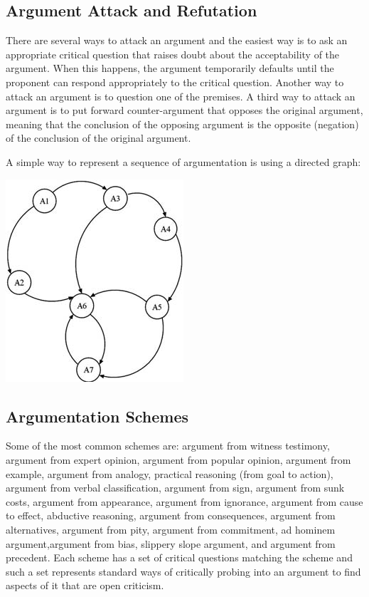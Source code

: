 \subsection{Argument Attack and Refutation}
\par
There are several ways to attack an argument and the easiest way is to ask an appropriate critical question that raises doubt about the acceptability of the argument. When this happens, the argument temporarily defaults until the proponent can respond appropriately to the critical question. Another way to attack an argument is to question one of the premises. A third way to attack an argument is to put forward counter-argument that opposes the original argument, meaning that the conclusion of the opposing argument is the opposite (negation) of the conclusion of the original argument.
\par
A simple way to represent a sequence of argumentation is using a directed graph:
\begin{center}
\includegraphics{attack.png}
\end{center}
\subsection{Argumentation Schemes}
\par
Some of the most common schemes are: argument from witness testimony, argument from expert opinion, argument from popular opinion, argument from example, argument from analogy, practical reasoning (from goal to action), argument from verbal classification, argument from sign, argument from sunk costs, argument from appearance, argument from ignorance, argument from cause to effect, abductive reasoning, argument from consequences, argument from alternatives, argument from pity, argument from commitment, ad hominem argument,argument from bias, slippery slope argument, and argument from precedent. Each scheme has a set of critical questions matching the scheme and such a set represents standard ways of critically probing into an argument to find aspects of it that are open criticism.

